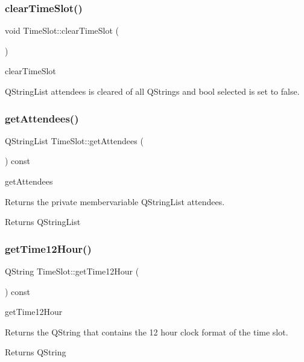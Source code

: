 \subsubsection{\texorpdfstring{clear\+Time\+Slot()}{clearTimeSlot()}}
{\footnotesize\ttfamily void Time\+Slot\+::clear\+Time\+Slot (\begin{DoxyParamCaption}{ }\end{DoxyParamCaption})}



clear\+Time\+Slot 

Q\+String\+List attendees is cleared of all Q\+Strings and bool selected is set to false. \mbox{\label{class_time_slot_a01c092d21d983b5b67cf2678f54d2c74}} 
\subsubsection{\texorpdfstring{get\+Attendees()}{getAttendees()}}
{\footnotesize\ttfamily Q\+String\+List Time\+Slot\+::get\+Attendees (\begin{DoxyParamCaption}{ }\end{DoxyParamCaption}) const}



get\+Attendees 

Returns the private membervariable Q\+String\+List attendees. \begin{DoxyReturn}{Returns}
Q\+String\+List 
\end{DoxyReturn}
\mbox{\label{class_time_slot_a23c04da070ed921bf66396da1d958547}} 
\subsubsection{\texorpdfstring{get\+Time12\+Hour()}{getTime12Hour()}}
{\footnotesize\ttfamily Q\+String Time\+Slot\+::get\+Time12\+Hour (\begin{DoxyParamCaption}{ }\end{DoxyParamCaption}) const}



get\+Time12\+Hour 

Returns the Q\+String that contains the 12 hour clock format of the time slot. \begin{DoxyReturn}{Returns}
Q\+String 
\end{DoxyReturn}
\mbox{\label{class_time_slot_aec0c82baaf408509d976307fa682e6ce}} 
